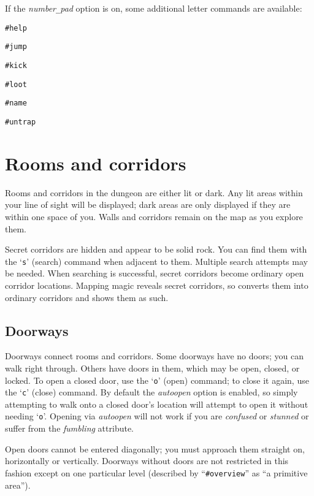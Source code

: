 \nd If the {\it number\verb+_+pad\/} option is on, some additional letter commands
are available:
\blist{}
\item[\tb{h}]
{\tt\#help}
\item[\tb{j}]
{\tt\#jump}
\item[\tb{k}]
{\tt\#kick}
\item[\tb{l}]
{\tt\#loot}
\item[\tb{N}]
{\tt\#name}
\item[\tb{u}]
{\tt\#untrap}
\elist


\section{Rooms and corridors}

Rooms and corridors in the dungeon are either lit or dark.
Any lit areas within your line of sight will be displayed;
dark areas are only displayed if they are within one space of you.
Walls and corridors remain on the map as you explore them.

Secret corridors are hidden and appear to be solid rock.
You can find them with the `{\tt s}' (search) command when adjacent
to them.
Multiple search attempts may be needed.
When searching is successful, secret corridors become ordinary open
corridor locations.
Mapping magic reveals secret corridors, so converts them into ordinary
corridors and shows them as such.

\subsection*{Doorways}

Doorways connect rooms and corridors.
Some doorways have no doors; you can walk right through.
Others have doors in them, which may be open, closed, or locked.
To open a closed door, use the `{\tt o}' (open)
command; to close it again, use the `{\tt c}' (close) command.
By default the
{\it autoopen}
option is enabled, so simply attempting to walk onto a closed door's
location will attempt to open it without needing `{\tt o}'.
Opening via
{\it autoopen}
will not work if you are {\it confused\/} or {\it stunned\/} or suffer from
the {\it fumbling\/} attribute.

Open doors cannot be entered diagonally; you must approach them
straight on, horizontally or vertically.
Doorways without doors are
not restricted in this fashion except on one particular level
(described by ``{\tt \#overview}'' as ``a primitive area'').

